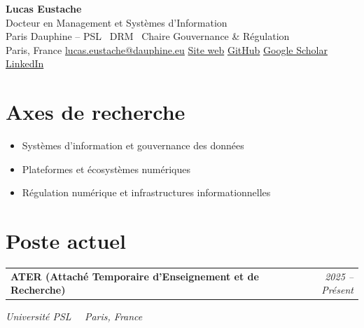 \documentclass[11pt,a4paper]{article}
\makeatletter
\newlength{\cvindent}
\let\cvoldsection\section
\renewcommand{\section}[1]{\Needspace{5\baselineskip}\cvoldsection{#1}}
\newenvironment{cvblock}[1][1]{%
  \par\noindent\hspace*{#1\cvindent}%
  \begin{minipage}{\dimexpr\linewidth-#1\cvindent\relax}%
}{%
  \end{minipage}\par
}
\newenvironment{cvdetails}{%
  \begin{list}{}{%
    \setlength{\leftmargin}{\cvindent}%
    \setlength{\rightmargin}{0pt}%
    \setlength{\topsep}{0.1em}%
    \setlength{\partopsep}{0pt}%
    \setlength{\parsep}{0.05em}%
    \setlength{\itemsep}{0pt}%
  }\item[]\small\ignorespaces
}{%
  \end{list}
}
\newcommand{\cvcontactsep}{\hspace{0.55em}{\color{rulecolor}\textbar}\hspace{0.55em}}
\newcommand{\cventry}[4]{%
  \begin{cvblock}
    \begin{tabularx}{\linewidth}{@{}X r@{}}%
      \textbf{#1} & \textit{#4} \\
    \end{tabularx}\par
    \begin{cvdetails}
      {\small\itshape #2%
        \if\relax\detokenize{#3}\relax
        \else\ \textbullet\ #3
        \fi}\par
    \end{cvdetails}
  \end{cvblock}\vspace{0.35em}%
}
\makeatother
\begin{document}
\pagestyle{plain}

\begin{center}
  {\fontsize{27}{31}\selectfont\bfseries\color{accent}Lucas Eustache}\\[0.15em]
  {\normalsize\color{muted}Docteur en Management et Systèmes d'Information}\\[0.1em]
  {\small Paris Dauphine -- PSL \textbullet\ DRM \textbullet\ Chaire Gouvernance \& Régulation}\\[0.35em]
  {\footnotesize
    Paris, France
    \cvcontactsep
    \href{mailto:lucas.eustache@dauphine.eu}{lucas.eustache@dauphine.eu}
    \cvcontactsep
    \href{https://lucaseust.github.io}{Site web}
    \cvcontactsep
    \href{https://github.com/Lucaseust}{GitHub}
    \cvcontactsep
    \href{https://scholar.google.com/citations?hl=fr&user=dGImyt0AAAAJ}{Google Scholar}
    \cvcontactsep
    \href{https://www.linkedin.com/in/lucas-eustache-611a9a223}{LinkedIn}
  }
\end{center}


\section{Axes de recherche}
\begin{itemize}
  \item Systèmes d'information et gouvernance des données
  \item Plateformes et écosystèmes numériques
  \item Régulation numérique et infrastructures informationnelles
\end{itemize}

\section{Poste actuel}
\cventry
  {ATER (Attaché Temporaire d'Enseignement et de Recherche)}
  {Université PSL}
  {Paris, France}
  {2025 -- Présent}


\end{document}
